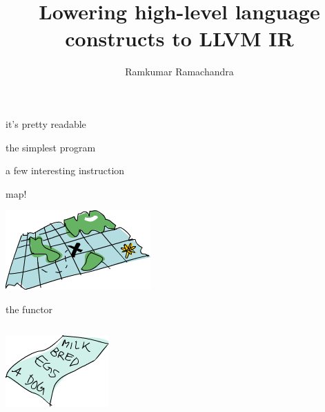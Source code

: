 \documentclass{beamer}
\title{Lowering high-level language constructs to LLVM IR}
\author{Ramkumar Ramachandra}
\begin{document}
\begin{frame}
  \titlepage
\end{frame}

\begin{frame}{it's pretty readable}
  
  
\end{frame}

\begin{frame}{the simplest program}
  
  
\end{frame}

\begin{frame}{a few interesting instruction}
  
  
\end{frame}

\begin{frame}{map!}
  \begin{center}\includegraphics[scale=0.6]{map}\end{center}
  \vfill
  
\end{frame}

\begin{frame}{the functor}
  \begin{columns}
    \begin{column}[b]{5.5cm}
      \includegraphics[scale=0.6]{list}
    \end{column}
    \begin{column}[b]{4.5cm}
      
    \end{column}
  \end{columns}
\end{frame}
\end{document}
